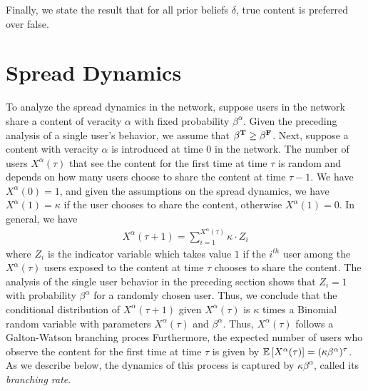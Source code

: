 Finally, we state the result that for all prior beliefs $\delta$,  true content is preferred over false. 


\section{Spread Dynamics}
To analyze the spread dynamics in the network, suppose users in the network share a content of veracity $\alpha$ with fixed probability $\beta^\alpha$. Given the preceding analysis of a single user's behavior, we assume that $\beta^{\mathbf{T}} \geq \beta^{\mathbf{F}}$. Next, suppose a content with veracity $\alpha$ is introduced at time $0$ in the network. The number of users $X^{\alpha}(\tau)$ that see the content for the first time at time $\tau$ is random and depends on how many users choose to share the content at time $\tau - 1$. We have $X^\alpha(0) = 1$, and given the assumptions on the spread dynamics, we have $X^\alpha(1) = \kappa$ if the user chooses to share the content, otherwise $X^\alpha(1) = 0$. In general, we have 
\begin{align} \label{eq:branching_process}
    X^{\alpha}(\tau + 1) =\sum_{i= 1}^{X^{\alpha}(\tau)} {\kappa \cdot Z_i}
\end{align} 
where $Z_i$ is the indicator variable which takes value $1$ if the $i^{th}$ user among the $X^{\alpha}(\tau)$ users exposed to the content at time $\tau$ chooses to share the content. The analysis of the single user behavior in the preceding section shows that $Z_i = 1$ with probability $\beta^{\alpha}$ for a randomly chosen user. Thus, we conclude that the conditional distribution of $X^{\alpha}(\tau + 1)$ given $X^{\alpha}(\tau)$ is $\kappa$ times a Binomial random variable with parameters $X^{\alpha}(\tau)$ and $\beta^{\alpha}$. Thus, $X^{\alpha}(\tau)$ follows a Galton-Watson branching proces%
Furthermore, the expected number of users who observe the content for the first time at time $\tau$ is given by $\mathbb{E}\left[ X^\alpha(\tau)\right] = (\kappa \beta^\alpha)^\tau$. As we describe below, the dynamics of this process is captured by $\kappa\beta^{\alpha}$, called its {\em branching rate}.


